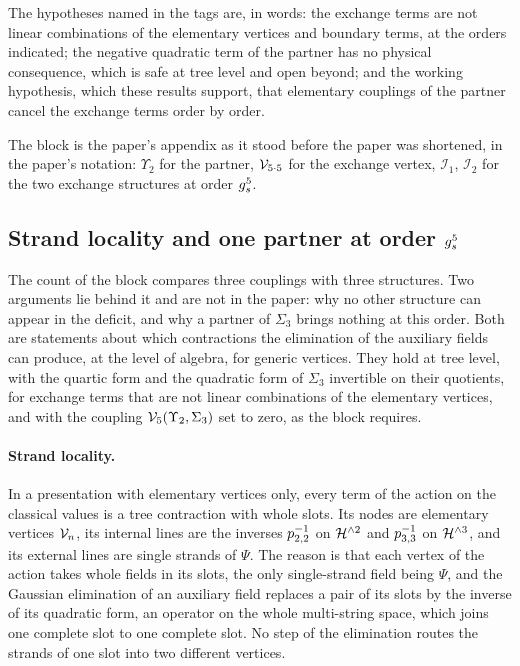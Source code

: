 The hypotheses named in the tags are, in words: the exchange terms are not linear combinations of the elementary vertices and boundary terms, at the orders indicated; the negative quadratic term of the partner has no physical consequence, which is safe at tree level and open beyond; and the working hypothesis, which these results support, that elementary couplings of the partner cancel the exchange terms order by order.

The block is the paper's appendix as it stood before the paper was shortened, in the paper's notation: $\Upsilon_2$ for the partner, $\mathcal{V}_{5 \cdot 5}$ for the exchange vertex, $\mathcal I_1$, $\mathcal I_2$ for the two exchange structures at order $g_s^5$.



\subsection{Strand locality and one partner at order \texorpdfstring{$g_s^5$}{gs5}}
\label{sec:partner:strand-locality}

The count of the block compares three couplings with three structures.
Two arguments lie behind it and are not in the paper: why no other structure can appear in the deficit, and why a partner of $\Sigma_3$ brings nothing at this order.
Both are statements about which contractions the elimination of the auxiliary fields can produce, at the level of algebra, for generic vertices.
They hold at tree level, with the quartic form and the quadratic form of $\Sigma_3$ invertible on their quotients, for exchange terms that are not linear combinations of the elementary vertices, and with the coupling $\mathcal{V}_{5}(\Upsilon_2, \Sigma_3)$ set to zero, as the block requires.

\paragraph{Strand locality.}
In a presentation with elementary vertices only, every term of the action on the classical values is a tree contraction with whole slots.
Its nodes are elementary vertices $\mathcal{V}_{n}$, its internal lines are the inverses $p_{2,2}^{-1}$ on $\mathcal{H}^{\wedge 2}$ and $p_{3,3}^{-1}$ on $\mathcal{H}^{\wedge 3}$, and its external lines are single strands of $\Psi$.
The reason is that each vertex of the action takes whole fields in its slots, the only single-strand field being $\Psi$, and the Gaussian elimination of an auxiliary field replaces a pair of its slots by the inverse of its quadratic form, an operator on the whole multi-string space, which joins one complete slot to one complete slot.
No step of the elimination routes the strands of one slot into two different vertices.


